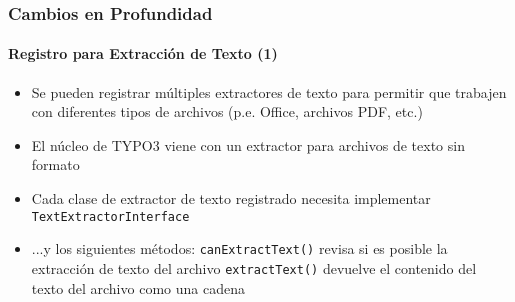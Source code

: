 \begin{frame}[fragile]
	\frametitle{Cambios en Profundidad}
	\framesubtitle{Registro para Extracción de Texto (1)}

	\lstset{basicstyle=\tiny\ttfamily}

	\begin{itemize}

		\item Se pueden registrar múltiples extractores de texto para permitir que trabajen
			con diferentes tipos de archivos (p.e. Office, archivos PDF, etc.)

		\item El núcleo de TYPO3 viene con un extractor para archivos de texto sin formato

		\item Cada clase de extractor de texto registrado necesita implementar \texttt{TextExtractorInterface}

		\item ...y los siguientes métodos:\newline
			\texttt{canExtractText()}\newline
			\small
				revisa si es posible la extracción de texto del archivo
			\normalsize
			\newline
			\texttt{extractText()}\newline
			\small
				devuelve el contenido del texto del archivo como una cadena
			\normalsize

	\end{itemize}

\end{frame}


